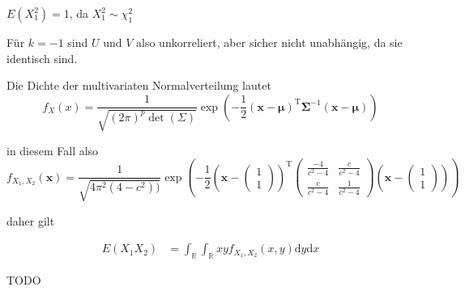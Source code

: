 $E(X_1^2) = 1$, da $X_1^2 \sim \chi_1^2$

Für $k= -1$ sind $U$ und $V$ also unkorreliert, aber sicher nicht unabhängig,
da sie identisch sind.

Die Dichte der multivariaten Normalverteilung lautet
\[f_X(x)=\frac{1}{ \sqrt{(2\pi)^p \det(\Sigma)} } \exp \left(-\frac{1}{2}({\mathbf x}-{\boldsymbol\mu})^\mathrm{T}{\boldsymbol\Sigma}^{-1}({\mathbf x}-{\boldsymbol\mu}) \right)\]

in diesem Fall also
\[f_{X_1, X_2}(\mathbf x) = \frac{1}{ \sqrt{4\pi^2 (4 - c^2))} } \exp \left(-\frac{1}{2}({\mathbf x}-\begin{pmatrix}1\\1\end{pmatrix})^\mathrm{T}\begin{pmatrix}\frac{-4}{c^2 - 4} & \frac{c}{c^2 - 4}\\\frac{c}{c^2 - 4} & \frac{1}{c^2 - 4}\end{pmatrix}({\mathbf x}-\begin{pmatrix}1\\1\end{pmatrix}) \right)\]

daher gilt

\begin{align}
    E(X_1 X_2) &= \int_{\mathbb{R}} \int_{\mathbb{R}} x y f_{X_1, X_2}(x, y) \mathrm{d} y \mathrm{d} x
\end{align}

 TODO
